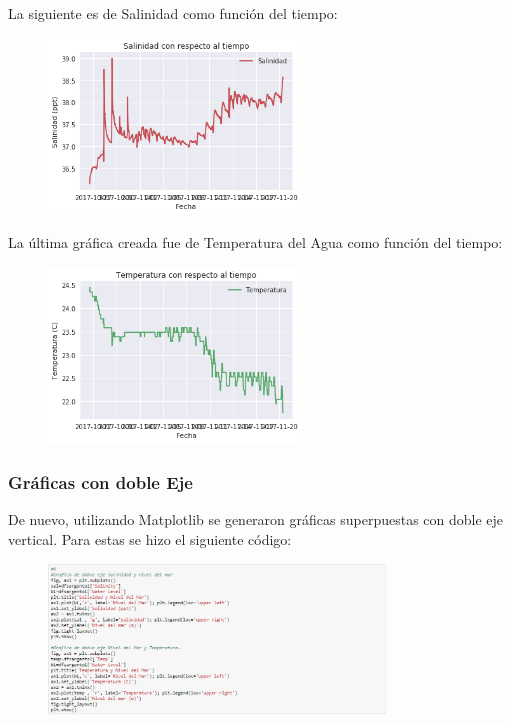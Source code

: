\documentclass[a4paper]{article}
\begin{document}
La siguiente es de Salinidad como función del tiempo:
\begin{figure}[ht!]
 \centering
  \includegraphics[width=0.6\textwidth]{Matplotlib2.png}
\end{figure}

\pagebreak
La última gráfica creada fue de Temperatura del Agua como función del tiempo:
\begin{figure}[ht!]
 \centering
  \includegraphics[width=0.6\textwidth]{Matplotlib3.png}
\end{figure}

\subsubsection{Gráficas con doble Eje}
De nuevo, utilizando Matplotlib se generaron gráficas superpuestas con doble eje vertical. Para estas se hizo el siguiente código:
\begin{figure}[ht!]
 \centering
  \includegraphics[width=0.8\textwidth]{DobleejeCodigo.PNG}
\end{figure}
\end{document}
